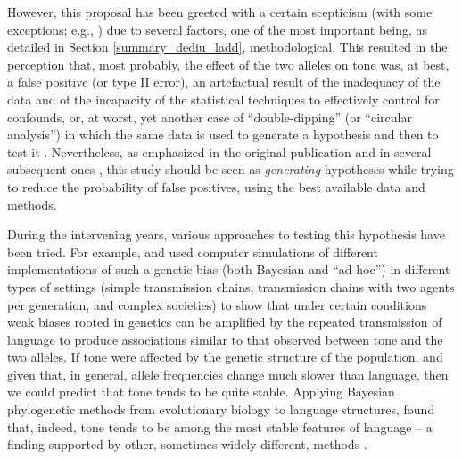 \documentclass[twoside,twocolumn]{article}
\begin{document}
However, this proposal has been greeted with a certain scepticism  (with some exceptions; e.g., \citealp{roberts_traffic_2013}) due to several factors, one of the most important being, as detailed in Section \ref{summary_dediu_ladd}, methodological.
This resulted in the perception that, most probably, the effect of the two alleles on tone was, at best, a false positive (or type II error), an artefactual result of the inadequacy of the data and of the incapacity of the statistical techniques to effectively control for confounds, or, at worst, yet another case of ``double-dipping'' (or ``circular analysis'') in which the same data is used to generate a hypothesis and then to test it \citep{kriegeskorte_circular_2009}.
Nevertheless, as emphasized in the original publication and in several subsequent ones \citep{dediu_ladd_2007,ladd_bioling_2008,dediu_humbiol_2011}, this study should be seen as \emph{generating} hypotheses while trying to reduce the probability of false positives, using the best available data and methods.

During the intervening years, various approaches to testing this hypothesis have been tried.
For example, \citet{dediu_jtb_2008} and \citet{dediu_jtb_2009} used computer simulations of different implementations of such a genetic bias (both Bayesian and ``ad-hoc'') in different types of settings (simple transmission chains, transmission chains with two agents per generation, and complex societies) to show that under certain conditions weak biases rooted in genetics can be amplified by the repeated transmission of language to produce associations similar to that observed between tone and the two alleles.
If tone were affected by the genetic structure of the population, and given that, in general, allele frequencies change much slower than language, then we could predict that tone tends to be quite stable.
Applying Bayesian phylogenetic methods from evolutionary biology to language structures, \citet{dediu_procb_2011} found that, indeed, tone tends to be among the most stable features of language -- a finding supported by other, sometimes widely different, methods \citep{dediu_cysouw_2013,kauhanen_geospatial_2018}.
\end{document}
